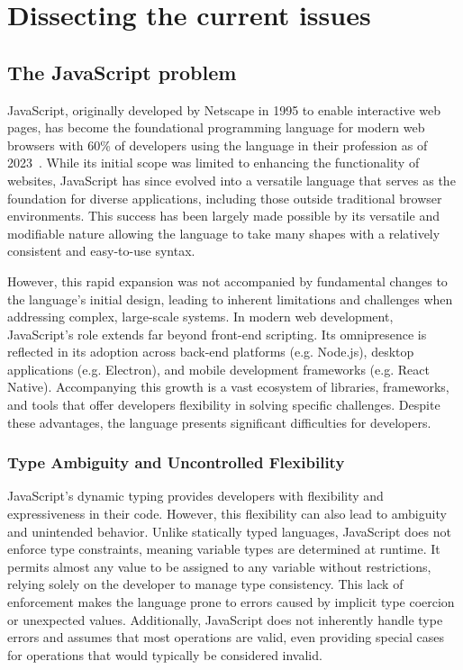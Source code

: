 \section{Dissecting the current issues}

\subsection{The JavaScript problem}

JavaScript, originally developed by Netscape in 1995 to enable interactive web pages, has become the foundational programming language for modern web browsers with 60\% of developers using the language in their profession as of 2023~\cite{jetbrains2023}. While its initial scope was limited to enhancing the functionality of websites, JavaScript has since evolved into a versatile language that serves as the foundation for diverse applications, including those outside traditional browser environments. This success has been largely made possible by its versatile and modifiable nature allowing the language to take many shapes with a relatively consistent and easy-to-use syntax.

However, this rapid expansion was not accompanied by fundamental changes to the language's initial design, leading to inherent limitations and challenges when addressing complex, large-scale systems. In modern web development, JavaScript's role extends far beyond front-end scripting. Its omnipresence is reflected in its adoption across back-end platforms (e.g. Node.js), desktop applications (e.g. Electron), and mobile development frameworks (e.g. React Native). Accompanying this growth is a vast ecosystem of libraries, frameworks, and tools that offer developers flexibility in solving specific challenges. Despite these advantages, the language presents significant difficulties for developers.

\subsubsection{Type Ambiguity and Uncontrolled Flexibility}

JavaScript’s dynamic typing provides developers with flexibility and expressiveness in their code. However, this flexibility can also lead to ambiguity and unintended behavior. Unlike statically typed languages, JavaScript does not enforce type constraints, meaning variable types are determined at runtime. It permits almost any value to be assigned to any variable without restrictions, relying solely on the developer to manage type consistency. This lack of enforcement makes the language prone to errors caused by implicit type coercion or unexpected values. Additionally, JavaScript does not inherently handle type errors and assumes that most operations are valid, even providing special cases for operations that would typically be considered invalid.

